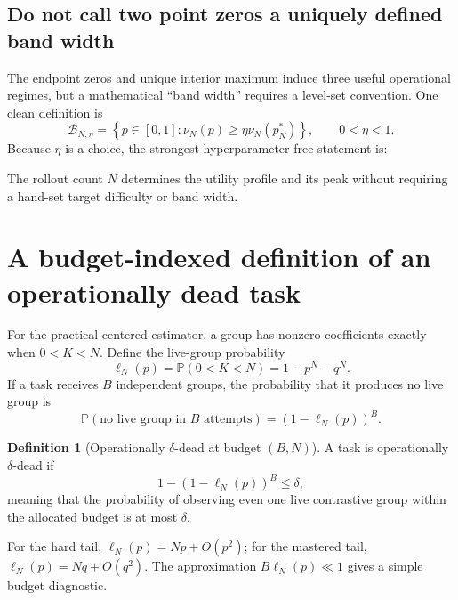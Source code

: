 \documentclass[11pt]{article}
\newcommand{\Prb}{\mathbb{P}}
\theoremstyle{definition}
\newtheorem{definition}[theorem]{Definition}
\theoremstyle{remark}
\begin{document}
\subsection{Do not call two point zeros a uniquely defined band width}

The endpoint zeros and unique interior maximum induce three useful operational regimes, but a mathematical ``band width'' requires a level-set convention. One clean definition is
\begin{equation}
\mathcal B_{N,\eta}
=\left\{p\in[0,1]:\nu_N(p)\ge \eta\nu_N(p_N^*)\right\},
\qquad 0<\eta<1.
\label{eq:band-levelset}
\end{equation}
Because $\eta$ is a choice, the strongest hyperparameter-free statement is:

\begin{rewritebox}
The rollout count $N$ determines the utility profile and its peak without requiring a hand-set target difficulty or band width.
\end{rewritebox}

\section{A budget-indexed definition of an operationally dead task}

For the practical centered estimator, a group has nonzero coefficients exactly when $0<K<N$. Define the live-group probability
\begin{equation}
\ell_N(p)=\Prb(0<K<N)=1-p^N-q^N.
\label{eq:liveprob}
\end{equation}
If a task receives $B$ independent groups, the probability that it produces no live group is
\begin{equation}
\Prb(\text{no live group in }B\text{ attempts})
=\left(1-\ell_N(p)\right)^B.
\label{eq:no-live}
\end{equation}

\begin{definition}[Operationally $\delta$-dead at budget $(B,N)$]
A task is operationally $\delta$-dead if
\begin{equation}
1-\left(1-\ell_N(p)\right)^B\le\delta,
\label{eq:delta-dead}
\end{equation}
meaning that the probability of observing even one live contrastive group within the allocated budget is at most $\delta$.
\end{definition}

For the hard tail, $\ell_N(p)=Np+O(p^2)$; for the mastered tail, $\ell_N(p)=Nq+O(q^2)$. The approximation $B\ell_N(p)\ll1$ gives a simple budget diagnostic.
\end{document}
